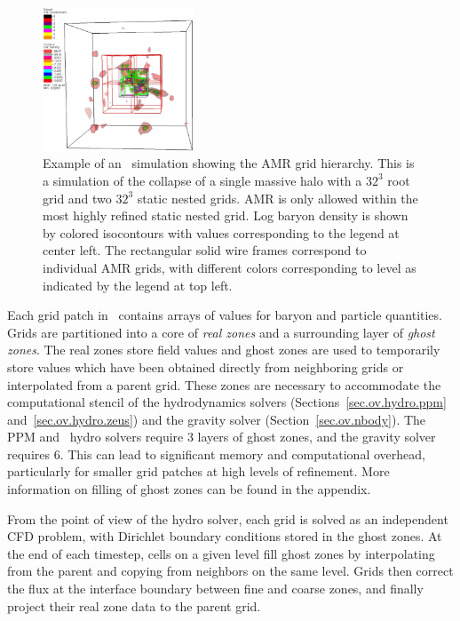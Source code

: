 \begin{figure}
\begin{center}
\includegraphics[width=0.4\textwidth]{figures/amr-hier-dens.eps}
\caption{Example of an \enzo\ simulation showing the AMR grid hierarchy.  
This is a simulation of the collapse of a single massive halo with a 
$32^3$ root grid and two $32^3$ static nested grids.  AMR is only allowed
within the most highly refined static nested grid.  Log baryon density is shown
by colored isocontours with values corresponding to the legend at center left.  
The rectangular solid wire frames correspond to individual 
AMR grids, with different colors corresponding to level as indicated by the
legend at top left.}
\label{fig.2.amrhierdens}
\end{center}
\end{figure}

Each grid patch in \enzo\ contains arrays of values for baryon and 
particle quantities.   Grids are 
partitioned into a core of \emph{real zones} and a surrounding layer 
of \emph{ghost zones}.  The real zones store field values and ghost 
zones are used to temporarily store values which have been obtained 
directly from neighboring grids or interpolated from a parent grid.  
These zones are necessary to accommodate the computational stencil of 
the hydrodynamics solvers (Sections~\ref{sec.ov.hydro.ppm} and~\ref{sec.ov.hydro.zeus}) 
and the gravity solver (Section~\ref{sec.ov.nbody}).  
The PPM and \zeus\ hydro solvers require 3 layers of ghost zones,  and the gravity
solver requires 6.  This can lead to significant memory 
and computational overhead, particularly for smaller grid patches
at high levels of refinement.  More information on filling of ghost
zones can be found in the appendix.

From the point of view of the hydro solver, each grid is solved as an
independent CFD problem, with Dirichlet boundary conditions stored in
the ghost zones.  At the end of each timestep, cells on a given level
fill ghost zones by interpolating from the parent and copying from
neighbors on the same level.  Grids then correct the flux at the interface boundary between
fine and coarse zones, and finally project their real zone data to the
parent grid. 

